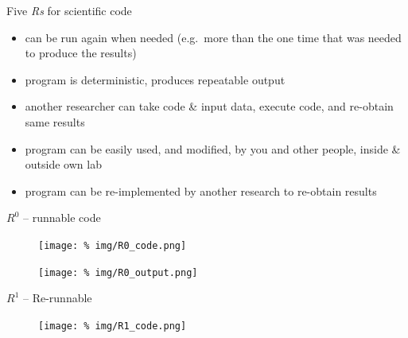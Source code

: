 \begin{frame}{Five \textit{Rs} for scientific code}

  
  \begin{itemize}[leftmargin=2.6cm]
    \itemsep11pt
    \item[$\mathbf{R^1}$ \textit{Re-runnable}:] can be run again when needed (e.g.~more than the one time that was needed to produce the results)

    \item[$\mathbf{R^2}$ \textit{Repeatable}:] program is deterministic, produces repeatable output

    \item[$\mathbf{R^3}$ \textit{Reproducible}:] another researcher can take code \& input data, execute code, and re-obtain same results

    \item[$\mathbf{R^4}$ \textit{Reusable}:] program  can be easily used, and
modified, by you and other people, inside \& outside own lab

    \item[$\mathbf{R^5}$ \textit{Replicable}:] program can be re-implemented by another research to re-obtain results

  \end{itemize}

  

  
  
  
\end{frame}



\begin{frame}{$R^0$ -- runnable code}

  \begin{figure}
    \centering
    \texttt{[image: \%
      img/R0\_code.png]} %
  \end{figure}

  \begin{figure}
    \centering
    \texttt{[image: \%
      img/R0\_output.png]} %
  \end{figure}

  \vspace{1.5cm}  

  
  
\end{frame}



\begin{frame}{$R^1$ -- Re-runnable}

  \begin{figure}
    \centering
    \texttt{[image: \%
      img/R1\_code.png]} %
  \end{figure} 
  
  
\end{frame}

